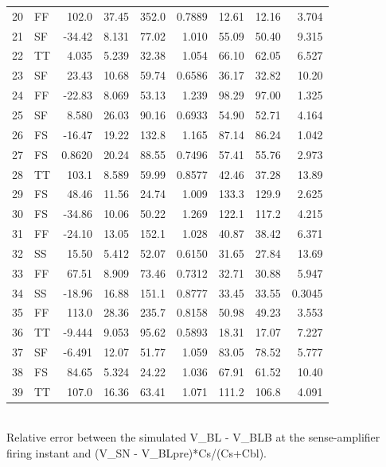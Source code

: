\begin{table}[!t]
\begin{tabular}{rlrrrrrrr}
20 & FF & 102.0 & 37.45 & 352.0 & 0.7889 & 12.61 & 12.16 & 3.704 \\
21 & SF & -34.42 & 8.131 & 77.02 & 1.010 & 55.09 & 50.40 & 9.315 \\
22 & TT & 4.035 & 5.239 & 32.38 & 1.054 & 66.10 & 62.05 & 6.527 \\
23 & SF & 23.43 & 10.68 & 59.74 & 0.6586 & 36.17 & 32.82 & 10.20 \\
24 & FF & -22.83 & 8.069 & 53.13 & 1.239 & 98.29 & 97.00 & 1.325 \\
25 & SF & 8.580 & 26.03 & 90.16 & 0.6933 & 54.90 & 52.71 & 4.164 \\
26 & FS & -16.47 & 19.22 & 132.8 & 1.165 & 87.14 & 86.24 & 1.042 \\
27 & FS & 0.8620 & 20.24 & 88.55 & 0.7496 & 57.41 & 55.76 & 2.973 \\
28 & TT & 103.1 & 8.589 & 59.99 & 0.8577 & 42.46 & 37.28 & 13.89 \\
29 & FS & 48.46 & 11.56 & 24.74 & 1.009 & 133.3 & 129.9 & 2.625 \\
30 & FS & -34.86 & 10.06 & 50.22 & 1.269 & 122.1 & 117.2 & 4.215 \\
31 & FF & -24.10 & 13.05 & 152.1 & 1.028 & 40.87 & 38.42 & 6.371 \\
32 & SS & 15.50 & 5.412 & 52.07 & 0.6150 & 31.65 & 27.84 & 13.69 \\
33 & FF & 67.51 & 8.909 & 73.46 & 0.7312 & 32.71 & 30.88 & 5.947 \\
34 & SS & -18.96 & 16.88 & 151.1 & 0.8777 & 33.45 & 33.55 & 0.3045 \\
35 & FF & 113.0 & 28.36 & 235.7 & 0.8158 & 50.98 & 49.23 & 3.553 \\
36 & TT & -9.444 & 9.053 & 95.62 & 0.5893 & 18.31 & 17.07 & 7.227 \\
37 & SF & -6.491 & 12.07 & 51.77 & 1.059 & 83.05 & 78.52 & 5.777 \\
38 & FS & 84.65 & 5.324 & 24.22 & 1.036 & 67.91 & 61.52 & 10.40 \\
39 & TT & 107.0 & 16.36 & 63.41 & 1.071 & 111.2 & 106.8 & 4.091 \\
\bottomrule
\end{tabular}
\\[2pt] \footnotesize Relative error between the simulated V\_BL - V\_BLB at the sense-amplifier firing instant and (V\_SN - V\_BLpre)*Cs/(Cs+Cbl).
\end{table}
